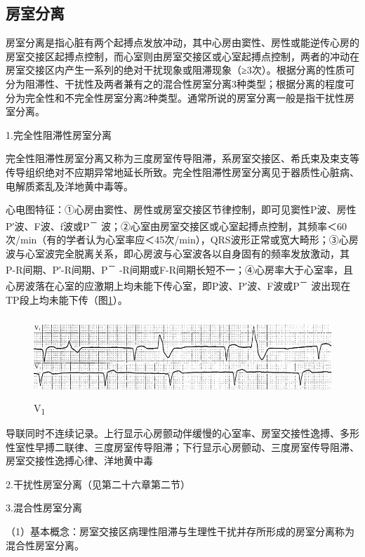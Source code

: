 \protect\hypertarget{text00037.htmlux5cux23subid433}{}{}

\subsection{房室分离}

房室分离是指心脏有两个起搏点发放冲动，其中心房由窦性、房性或能逆传心房的房室交接区起搏点控制，而心室则由房室交接区或心室起搏点控制，两者的冲动在房室交接区内产生一系列的绝对干扰现象或阻滞现象（≥3次）。根据分离的性质可分为阻滞性、干扰性及两者兼有之的混合性房室分离3种类型；根据分离的程度可分为完全性和不完全性房室分离2种类型。通常所说的房室分离一般是指干扰性房室分离。

1.完全性阻滞性房室分离

完全性阻滞性房室分离又称为三度房室传导阻滞，系房室交接区、希氏束及束支等传导组织绝对不应期异常地延长所致。完全性阻滞性房室分离见于器质性心脏病、电解质紊乱及洋地黄中毒等。

心电图特征：①心房由窦性、房性或房室交接区节律控制，即可见窦性P波、房性P′波、F波、f波或P\textsuperscript{－}
波；②心室由房室交接区或心室起搏点控制，其频率＜60次/min（有的学者认为心室率应＜45次/min），QRS波形正常或宽大畸形；③心房波与心室波完全脱离关系，即心房波与心室波各以自身固有的频率发放激动，其P-R间期、P′-R间期、P\textsuperscript{－}
-R间期或F-R间期长短不一；④心房率大于心室率，且心房波落在心室的应激期上均未能下传心室，即P波、P′波、F波或P\textsuperscript{－}
波出现在TP段上均未能下传（图\ref{fig30-3}）。

\begin{figure}[!htbp]
 \centering
 \includegraphics[width=5.58333in,height=1.20833in]{./images/Image00498.jpg}
 \captionsetup{justification=centering}
 \caption{V\textsubscript{1}}
 \label{fig30-3}
  \end{figure} 
导联同时不连续记录。上行显示心房颤动伴缓慢的心室率、房室交接性逸搏、多形性室性早搏二联律、三度房室传导阻滞；下行显示心房颤动、三度房室传导阻滞、房室交接性逸搏心律、洋地黄中毒

2.干扰性房室分离（见第二十六章第二节）

3.混合性房室分离

（1）基本概念：房室交接区病理性阻滞与生理性干扰并存所形成的房室分离称为混合性房室分离。

